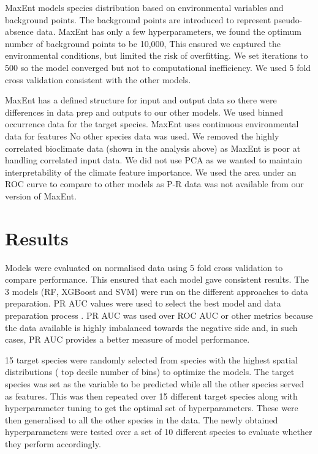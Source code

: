 \documentclass{article}
\begin{document}
MaxEnt models species distribution based on environmental variables and background points. The background points are introduced to represent pseudo-absence data\cite{pseudo-absences}. MaxEnt has only a few hyperparameters, we found the optimum number of background points to be 10,000, This ensured we captured the environmental conditions, but limited the risk of overfitting.  We set iterations to 500 so the model converged but not to computational inefficiency. We used 5 fold cross validation consistent with the other models. 

MaxEnt has a defined structure for input and output data so there were differences in data prep and outputs to our other models.  We used binned occurrence data for the target species.  MaxEnt  uses continuous environmental data for features No other species data was used. We removed the highly correlated bioclimate data (shown in the analysis above) as MaxEnt is poor at handling correlated input data.  We did not use PCA as we wanted to maintain interpretability of the climate feature importance.   We used the area under an ROC curve to compare to other models as P-R data was not available from our version of MaxEnt.

\section{Results}

Models were evaluated on normalised data using 5 fold cross validation to compare performance.  This ensured that each model gave consistent results. The 3 models (RF, XGBoost and SVM) were run on the different approaches to data preparation.  PR AUC values were used to select the best model and data preparation process . PR AUC was used over ROC AUC or other metrics because the data available is highly imbalanced towards the negative side and, in such cases, PR AUC provides a better measure of model performance.

15 target species were randomly selected from species with the highest spatial distributions ( top decile number of bins) to optimize the models. The target species was set as the variable to be predicted while all the other species served as features. This was then repeated over 15 different target species along with hyperparameter tuning to get the optimal set of hyperparameters. These were then generalised to all the other species in the data. The newly obtained hyperparameters were tested over a set of 10 different species to evaluate whether they perform accordingly. 
\end{document}
